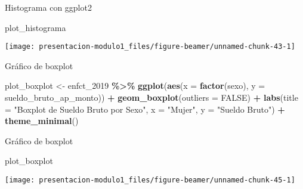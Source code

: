 \documentclass[
  ignorenonframetext,
]{beamer}
\newenvironment{Shaded}{\begin{snugshade}}{\end{snugshade}}
\newcommand{\AttributeTok}[1]{\textcolor[rgb]{0.13,0.29,0.53}{#1}}
\newcommand{\ConstantTok}[1]{\textcolor[rgb]{0.56,0.35,0.01}{#1}}
\newcommand{\FunctionTok}[1]{\textcolor[rgb]{0.13,0.29,0.53}{\textbf{#1}}}
\newcommand{\NormalTok}[1]{#1}
\newcommand{\OtherTok}[1]{\textcolor[rgb]{0.56,0.35,0.01}{#1}}
\newcommand{\SpecialCharTok}[1]{\textcolor[rgb]{0.81,0.36,0.00}{\textbf{#1}}}
\newcommand{\StringTok}[1]{\textcolor[rgb]{0.31,0.60,0.02}{#1}}
\begin{document}
\begin{frame}[fragile]{Histograma con ggplot2}
\label{histograma-con-ggplot2-1}
\begin{Shaded}
\begin{Highlighting}[]
\NormalTok{plot\_histograma}
\end{Highlighting}
\end{Shaded}

\begin{center}\texttt{[image: presentacion-modulo1\_files/figure-beamer/unnamed-chunk-43-1]} \end{center}
\end{frame}

\begin{frame}[fragile]{Gráfico de boxplot}
\label{gruxe1fico-de-boxplot}
\begin{Shaded}
\begin{Highlighting}[]
\NormalTok{plot\_boxplot }\OtherTok{\textless{}{-}}\NormalTok{ enfct\_2019 }\SpecialCharTok{\%\textgreater{}\%}
  \FunctionTok{ggplot}\NormalTok{(}\FunctionTok{aes}\NormalTok{(}\AttributeTok{x =} \FunctionTok{factor}\NormalTok{(sexo), }\AttributeTok{y =}\NormalTok{ sueldo\_bruto\_ap\_monto)) }\SpecialCharTok{+}
  \FunctionTok{geom\_boxplot}\NormalTok{(}\AttributeTok{outliers =} \ConstantTok{FALSE}\NormalTok{) }\SpecialCharTok{+}
  \FunctionTok{labs}\NormalTok{(}\AttributeTok{title =} \StringTok{"Boxplot de Sueldo Bruto por Sexo"}\NormalTok{,}
       \AttributeTok{x =} \StringTok{"Mujer"}\NormalTok{,}
       \AttributeTok{y =} \StringTok{"Sueldo Bruto"}\NormalTok{) }\SpecialCharTok{+}
  \FunctionTok{theme\_minimal}\NormalTok{()}
\end{Highlighting}
\end{Shaded}
\end{frame}

\begin{frame}[fragile]{Gráfico de boxplot}
\label{gruxe1fico-de-boxplot-1}
\begin{Shaded}
\begin{Highlighting}[]
\NormalTok{plot\_boxplot}
\end{Highlighting}
\end{Shaded}

\begin{center}\texttt{[image: presentacion-modulo1\_files/figure-beamer/unnamed-chunk-45-1]} \end{center}
\end{frame}
\end{document}
